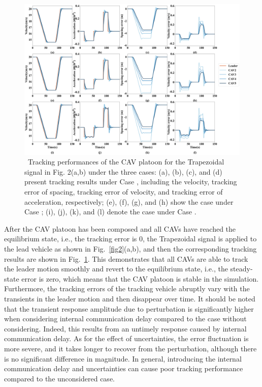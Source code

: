 \documentclass[a4paper]{cas-sc}
\begin{document}
\begin{figure}
  \centering
  \includegraphics[width=14cm]{figs/fig3.png}
  \caption{~Tracking performances of the CAV platoon for the Trapezoidal signal in Fig. 2(a,b) under the three cases: (a), (b), (c), and (d) present tracking results under Case \uppercase\expandafter{}, including the velocity, tracking error of spacing, tracking error of velocity, and tracking error of acceleration, respectively; (e), (f), (g), and (h) show the case under Case  \uppercase\expandafter{}; (i), (j), (k), and (l) denote the case under Case \uppercase\expandafter{}.}
  \label{fig3}
\end{figure}

After the CAV platoon has been composed and all CAVs have reached the equilibrium state, i.e., the tracking error is 0, the Trapezoidal signal is applied to the lead vehicle as shown in Fig.~\ref{fig2}(a,b), and then the corresponding tracking results are shown in Fig.~\ref{fig3}. This demonstrates that all CAVs are able to track the leader motion smoothly and revert to the equilibrium state, i.e., the steady-state error is zero, which means that the CAV platoon is stable in the simulation. Furthermore, the tracking errors of the tracking vehicle abruptly vary with the transients in the leader motion and then disappear over time. It should be noted that the transient response amplitude due to perturbation is significantly higher when considering internal communication delay compared to the case without considering. Indeed, this results from an untimely response caused by internal communication delay. As for the effect of uncertainties, the error fluctuation is more severe, and it takes longer to recover from the perturbation, although there is no significant difference in magnitude. In general, introducing the internal communication delay and uncertainties can cause poor tracking performance compared to the unconsidered case.
\end{document}
